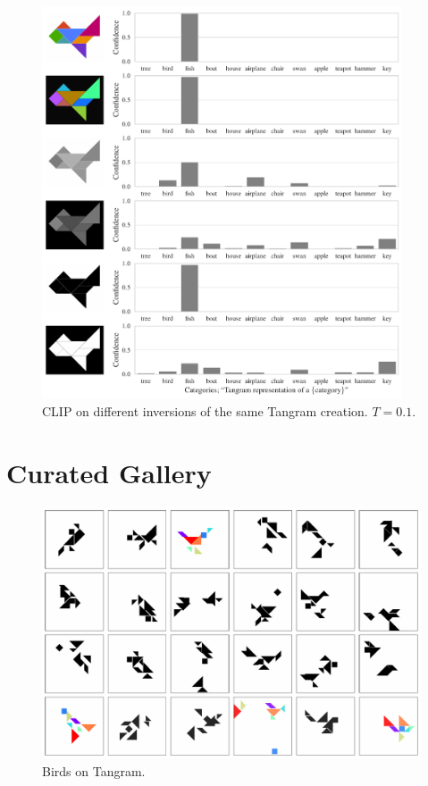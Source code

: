 \begin{figure}[h]
    \centering
    \includegraphics[width=0.95\textwidth]{images/tangram_fish_10.pdf}
    \caption{CLIP on different inversions of the same Tangram creation. \(T = 0.1\).}
    \label{fig:clip-tangram-inversions}
\end{figure}


\chapter{Curated Gallery}
\label{sec:gallery}

\begin{figure}[H]
    \centering
    \includegraphics[width=\textwidth]{images/curation_bird.pdf}
    \caption{Birds on Tangram.}
    \label{fig:curation_bird}
\end{figure}

